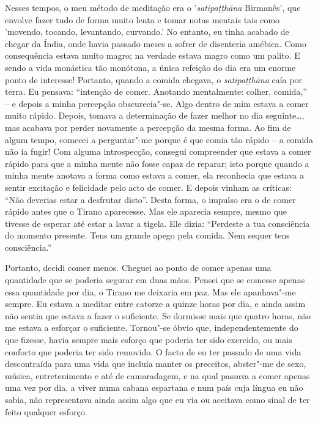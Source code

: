 Nesses tempos, o meu método de meditação era o '\emph{satipaṭṭhāna}
Birmanês', que envolve fazer tudo de forma muito lenta e tomar notas
mentais tais como 'movendo, tocando, levantando, curvando.' No entanto,
eu tinha acabado de chegar da Índia, onde havia passado meses a sofrer
de disenteria amébica. Como consequência estava muito magro; na verdade
estava magro como um palito. E sendo a vida monástica tão monótona, a
única refeição do dia era um enorme ponto de interesse! Portanto, quando
a comida chegava, o \emph{satipaṭṭhāna} caía por terra. Eu pensava:
“intenção de comer. Anotando mentalmente: colher, comida,” -- e depois a
minha percepção obscurecia"-se. Algo dentro de mim estava a comer muito
rápido. Depois, tomava a determinação de fazer melhor no dia
seguinte\ldots{}, mas acabava por perder novamente a percepção da mesma
forma. Ao fim de algum tempo, comecei a perguntar"-me porque é que comia
tão rápido -- a comida não ia fugir! Com alguma introspecção, consegui
compreender que estava a comer rápido para que a minha mente não fosse
capaz de reparar; isto porque quando a minha mente anotava a forma como
estava a comer, ela reconhecia que estava a sentir excitação e
felicidade pelo acto de comer. E depois vinham as críticas: “Não
deverias estar a desfrutar disto”. Desta forma, o impulso era o de comer
rápido antes que o Tirano aparecesse. Mas ele aparecia sempre, mesmo que
tivesse de esperar até estar a lavar a tigela. Ele dizia: “Perdeste a
tua consciência do momento presente. Tens um grande apego pela comida.
Nem sequer tens consciência.”

Portanto, decidi comer menos. Cheguei ao ponto de comer apenas uma
quantidade que se poderia segurar em duas mãos. Pensei que se comesse
apenas essa quantidade por dia, o Tirano me deixaria em paz. Mas ele
apanhava"-me sempre. Eu estava a meditar entre catorze a quinze horas por
dia, e ainda assim não sentia que estava a fazer o suficiente. Se
dormisse mais que quatro horas, não me estava a esforçar o suficiente.
Tornou"-se óbvio que, independentemente do que fizesse, havia sempre mais
esforço que poderia ter sido exercido, ou mais conforto que poderia ter
sido removido. O facto de eu ter passado de uma vida descontraída para
uma vida que incluía manter os preceitos, abster"-me de sexo, música,
entretenimento e até de camaradagem, e na qual passava a comer apenas
uma vez por dia, a viver numa cabana espartana e num país cuja língua eu
não sabia, não representava ainda assim algo que eu via ou aceitava como
sinal de ter feito qualquer esforço.

